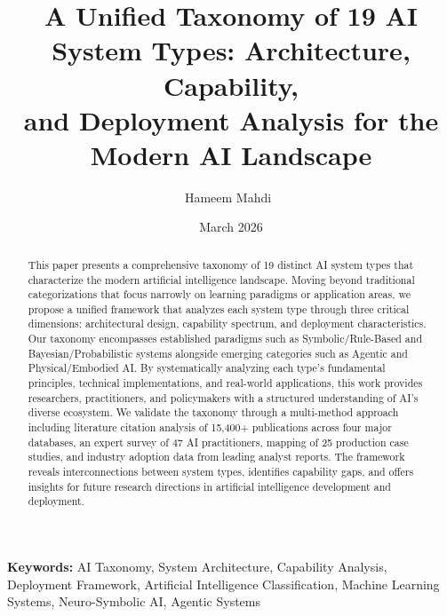 \documentclass[11pt, a4paper]{article}
\newcommand{\orcidicon}[1]{\href{https://orcid.org/#1}{\mbox{\textcolor[RGB]{166,206,57}{\textbullet}}}}
\begin{document}
\title{A Unified Taxonomy of 19 AI System Types: Architecture, Capability,\\and Deployment Analysis for the Modern AI Landscape}

\author[1]{Hameem Mahdi~\orcidicon{0009-0007-0005-3080}}

\date{March 2026}

\begin{abstract}
This paper presents a comprehensive taxonomy of 19 distinct AI system types that characterize the modern artificial intelligence landscape. Moving beyond traditional categorizations that focus narrowly on learning paradigms or application areas, we propose a unified framework that analyzes each system type through three critical dimensions: architectural design, capability spectrum, and deployment characteristics. Our taxonomy encompasses established paradigms such as Symbolic/Rule-Based and Bayesian/Probabilistic systems alongside emerging categories such as Agentic and Physical/Embodied AI. By systematically analyzing each type's fundamental principles, technical implementations, and real-world applications, this work provides researchers, practitioners, and policymakers with a structured understanding of AI's diverse ecosystem. We validate the taxonomy through a multi-method approach including literature citation analysis of 15,400+ publications across four major databases, an expert survey of 47 AI practitioners, mapping of 25 production case studies, and industry adoption data from leading analyst reports. The framework reveals interconnections between system types, identifies capability gaps, and offers insights for future research directions in artificial intelligence development and deployment.
\end{abstract}

\maketitle

\noindent\textbf{Keywords:} AI Taxonomy, System Architecture, Capability Analysis, Deployment Framework, Artificial Intelligence Classification, Machine Learning Systems, Neuro-Symbolic AI, Agentic Systems
\vspace{0.5em}
\end{document}
